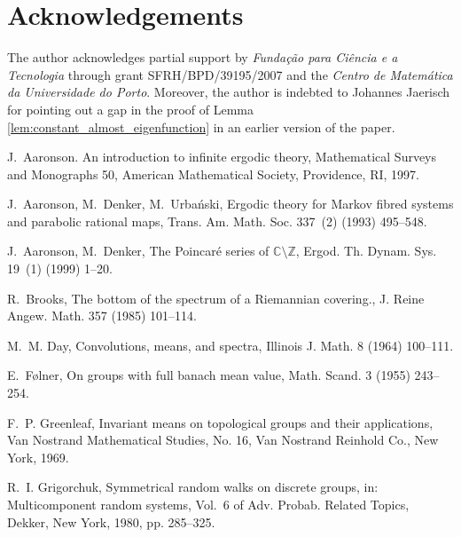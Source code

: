\documentclass[10pt]{article}
\theoremstyle{mystyle}
\newcommand{\1}{\mathbf{1}}
\begin{document}
\section*{Acknowledgements}
The author acknowledges partial support by \emph{Fundação para Ciência e a Tecnologia} through grant SFRH/BPD/39195/2007 and the \emph{Centro de Matemática da Universidade do Porto}. Moreover, the author is indebted to Johannes Jaerisch for pointing out a gap in the proof of Lemma \ref{lem:constant_almost_eigenfunction} in an earlier version of the paper.


%
%

\begin{thebibliography}{10}

J.~Aaronson. {An introduction to infinite ergodic theory}, {Mathematical Surveys and Monographs 50}, American Mathematical Society, Providence, RI, 1997.



J.~Aaronson, M.~Denker, M.~Urba{\'n}ski, Ergodic theory for {M}arkov fibred
  systems and parabolic rational maps, Trans. Am. Math. Soc. 337~(2) (1993)
  495--548.

J.~Aaronson, M.~Denker,
  {The {P}oincar{\'e} series of $ \mathbb{C} \setminus\mathbb{Z} $}, Ergod. Th.
  Dynam. Sys. 19~(1) (1999) 1--20.

R.~Brooks, {The bottom of the spectrum of a Riemannian covering.}, J. Reine
  Angew. Math. 357 (1985) 101--114.
  
M.~M. Day, Convolutions, means, and spectra, Illinois J. Math. 8 (1964)
  100--111.

E.~F{\o}lner,
  {On groups with full banach mean value}, Math. Scand. 3 (1955) 243--254.

F.~P. Greenleaf, Invariant means on topological groups and their applications,
  Van Nostrand Mathematical Studies, No. 16, Van Nostrand Reinhold Co., New
  York, 1969.

R.~I. Grigorchuk, Symmetrical random walks on discrete groups, in:
  Multicomponent random systems, Vol.~6 of Adv. Probab. Related Topics, Dekker,
  New York, 1980, pp. 285--325.


\end{thebibliography}
\end{document}
